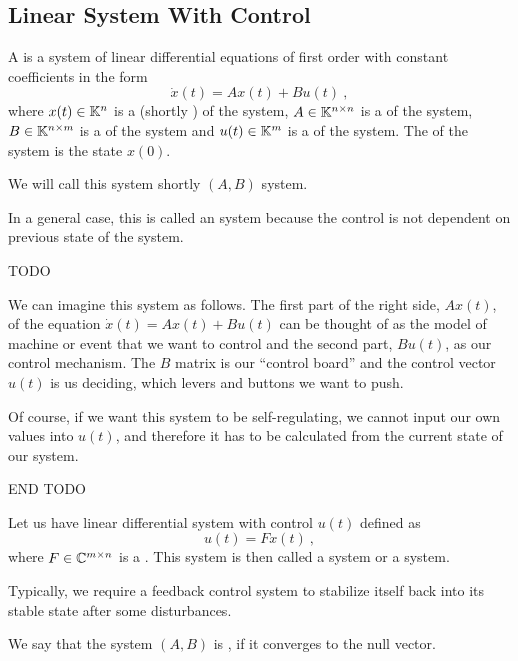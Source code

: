 \subsection{Linear System With Control}

\begin{definition}
	A  is a system of linear differential equations of first order with constant coefficients in the form $$\dot{x}(t)=Ax(t)+Bu(t)\ ,$$ where $x(t)\in\mathbb{K}^n$ is a  (shortly ) of the system, $A\in\mathbb{K}^{n\times n}$ is a  of the system, $B\in\mathbb{K}^{n\times m}$ is a  of the system and $u(t)\in\mathbb{K}^m$ is a  of the system. The  of the system is the state $x(0)$.

	We will call this system shortly $(A,B)$ system.
\end{definition}

In a general case, this is called an  system because the control is not dependent on previous state of the system.

TODO

We can imagine this system as follows. The first part of the right side, $Ax(t)$, of the equation $\dot{x}(t)=Ax(t)+Bu(t)$ can be thought of as the model of machine or event that we want to control and the second part, $Bu(t)$, as our control mechanism. The $B$ matrix is our ``control board'' and the control vector $u(t)$ is us deciding, which levers and buttons we want to push. 

Of course, if we want this system to be self-regulating, we cannot input our own values into $u(t)$, and therefore it has to be calculated from the current state of our system.

END TODO

\begin{definition}
	Let us have linear differential system with control $u(t)$ defined as
	$$u(t)=Fx(t)\ ,$$
	where $F\in\mathbb{C}^{m\times n}$ is a . This system is then called a  system or a  system.
\end{definition}

Typically, we require a feedback control system to stabilize itself back into its stable state after some disturbances. 

\begin{definition}
	We say that the system $(A,B)$ is , if it converges to the null vector.
\end{definition}

